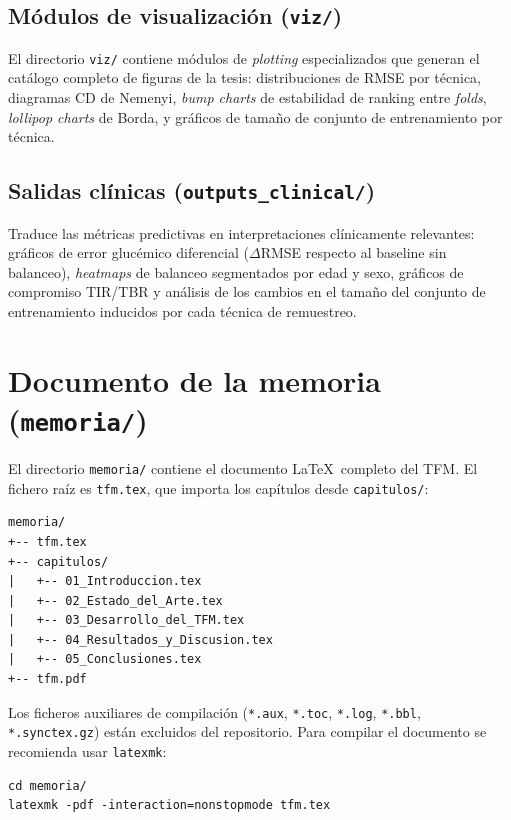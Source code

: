 \subsection{Módulos de visualización (\texttt{viz/})}
\label{subsec:anexo_viz}

El directorio \texttt{viz/} contiene módulos de \textit{plotting}
especializados que generan el catálogo completo de figuras de la tesis:
distribuciones de RMSE por técnica, diagramas CD de Nemenyi,
\textit{bump charts} de estabilidad de ranking entre \textit{folds},
\textit{lollipop charts} de Borda, y gráficos de tamaño de conjunto de
entrenamiento por técnica.

\subsection{Salidas clínicas (\texttt{outputs\_clinical/})}
\label{subsec:anexo_clinical}

Traduce las métricas predictivas en interpretaciones clínicamente
relevantes: gráficos de error glucémico diferencial ($\Delta$RMSE
respecto al baseline sin balanceo), \textit{heatmaps} de balanceo
segmentados por edad y sexo, gráficos de compromiso TIR/TBR y análisis
de los cambios en el tamaño del conjunto de entrenamiento inducidos por
cada técnica de remuestreo.

\section{Documento de la memoria (\texttt{memoria/})}
\label{sec:anexo_memoria}

El directorio \texttt{memoria/} contiene el documento \LaTeX\ completo
del TFM. El fichero raíz es \texttt{tfm.tex}, que importa los capítulos
desde \texttt{capitulos/}:

\begin{verbatim}
memoria/
+-- tfm.tex
+-- capitulos/
|   +-- 01_Introduccion.tex
|   +-- 02_Estado_del_Arte.tex
|   +-- 03_Desarrollo_del_TFM.tex
|   +-- 04_Resultados_y_Discusion.tex
|   +-- 05_Conclusiones.tex
+-- tfm.pdf
\end{verbatim}

Los ficheros auxiliares de compilación (\texttt{*.aux}, \texttt{*.toc},
\texttt{*.log}, \texttt{*.bbl}, \texttt{*.synctex.gz}) están excluidos
del repositorio. Para compilar el documento se recomienda usar
\texttt{latexmk}:

\begin{verbatim}
cd memoria/
latexmk -pdf -interaction=nonstopmode tfm.tex
\end{verbatim}